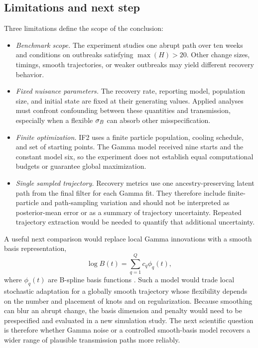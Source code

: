 \subsection{Limitations and next step}

Three limitations define the scope of the conclusion:
\begin{itemize}
\item \emph{Benchmark scope.}  The experiment studies one abrupt path over ten
weeks and conditions on outbreaks satisfying \(\max(H)>20\).  Other change
sizes, timings, smooth trajectories, or weaker outbreaks may yield different
recovery behavior.
\item \emph{Fixed nuisance parameters.}  The recovery rate, reporting model,
population size, and initial state are fixed at their generating values.
Applied analyses must confront confounding between these quantities and
transmission, especially when a flexible \(\sigma_B\) can absorb other
misspecification.
\item \emph{Finite optimization.}  IF2 uses a finite particle population,
cooling schedule, and set of starting points.  The Gamma model received nine
starts and the constant model six, so the experiment does not establish equal
computational budgets or guarantee global maximization.
\item \emph{Single sampled trajectory.}  Recovery metrics use one
ancestry-preserving latent path from the final filter for each Gamma fit.  They
therefore include finite-particle and path-sampling variation and should not be
interpreted as posterior-mean error or as a summary of trajectory uncertainty.
Repeated trajectory extraction would be needed to quantify that additional
uncertainty.
\end{itemize}

A useful next comparison would replace local Gamma innovations with a smooth
basis representation,
\[
\log B(t)=\sum_{q=1}^{Q}c_q\phi_q(t),
\]
where \(\phi_q(t)\) are B-spline basis functions
\citep{bouman2024timevarying}.  Such a model would trade local stochastic
adaptation for a globally smooth trajectory whose flexibility depends on the
number and placement of knots and on regularization.  Because smoothing can
blur an abrupt change, the basis dimension and penalty would need to be
prespecified and evaluated in a new simulation study.  The next scientific
question is therefore whether Gamma noise or a controlled smooth-basis model
recovers a wider range of plausible transmission paths more reliably.
